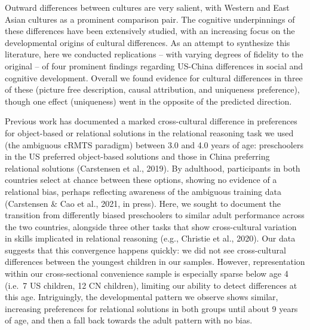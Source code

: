 \documentclass[10pt, letterpaper]{article}
\begin{document}
Outward differences between cultures are very salient, with Western and
East Asian cultures as a prominent comparison pair. The cognitive
underpinnings of these differences have been extensively studied, with
an increasing focus on the developmental origins of cultural
differences. As an attempt to synthesize this literature, here we
conducted replications -- with varying degrees of fidelity to the
original -- of four prominent findings regarding US-China differences in
social and cognitive development. Overall we found evidence for cultural
differences in three of these (picture free description, causal
attribution, and uniqueness preference), though one effect (uniqueness)
went in the opposite of the predicted direction.

Previous work has documented a marked cross-cultural difference in
preferences for object-based or relational solutions in the relational
reasoning task we used (the ambiguous cRMTS paradigm) between 3.0 and
4.0 years of age: preschoolers in the US preferred object-based
solutions and those in China preferring relational solutions (Carstensen
et al., 2019). By adulthood, participants in both countries select at
chance between these options, showing no evidence of a relational bias,
perhaps reflecting awareness of the ambiguous training data (Carstensen
\& Cao et al., 2021, in press). Here, we sought to document the
transition from differently biased preschoolers to similar adult
performance across the two countries, alongside three other tasks that
show cross-cultural variation in skills implicated in relational
reasoning (e.g., Christie et al., 2020). Our data suggests that this
convergence happens quickly: we did not see cross-cultural differences
between the youngest children in our samples. However, representation
within our cross-sectional convenience sample is especially sparse below
age 4 (i.e.~7 US children, 12 CN children), limiting our ability to
detect differences at this age. Intriguingly, the developmental pattern
we observe shows similar, increasing preferences for relational
solutions in both groups until about 9 years of age, and then a fall
back towards the adult pattern with no bias.
\end{document}
